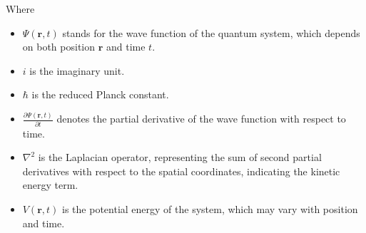 Where
\begin{itemize}
\item $\Psi(\mathbf{r}, t)$ stands for the wave function of the quantum system, which depends on both position $\mathbf{r}$ and time $t$.
\item $i$ is the imaginary unit.
\item $\hbar$ is the reduced Planck constant.
\item $\frac{\partial \Psi(\mathbf{r}, t)}{\partial t}$ denotes the partial derivative of the wave function with respect to time.
\item $\nabla^2$ is the Laplacian operator, representing the sum of second partial derivatives with respect to the spatial coordinates, indicating the kinetic energy term.
\item $V(\mathbf{r}, t)$ is the potential energy of the system, which may vary with position and time.
\end{itemize}